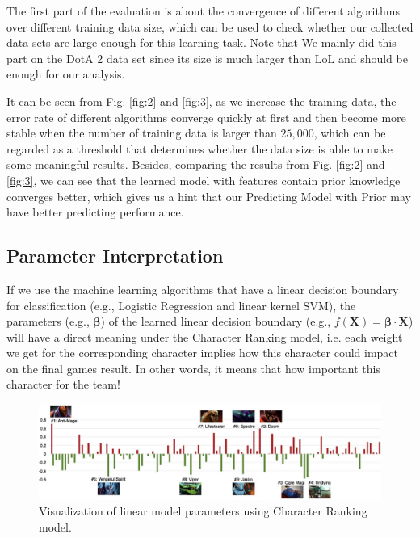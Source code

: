 \documentclass{article} %
\begin{document}
The first part of the evaluation is about the convergence of different algorithms over different training data size, which can be used to check whether our collected data sets are large enough for this learning task. Note that We mainly did this part on the DotA 2 data set since its size is much larger than LoL and should be enough for our analysis.

It can be seen from Fig. \ref{fig:2} and \ref{fig:3}, as we increase the training data, the error rate of different algorithms converge quickly at first and then become more stable when the number of training data is larger than $25,000$, which can be regarded as a threshold that determines whether the data size is able to make some meaningful results. Besides, comparing the results from Fig. \ref{fig:2} and \ref{fig:3}, we can see that the learned model with features contain prior knowledge converges better, which gives us a hint that our Predicting Model with Prior may have better predicting performance.




\subsection{Parameter Interpretation}



If we use the machine learning algorithms that have a linear decision boundary for classification (e.g., Logistic Regression and linear kernel SVM), the parameters (e.g., $\mathbf{\beta}$) of the learned linear decision boundary (e.g., $f(\mathbf{X}) = \mathbf{\beta}\cdot \mathbf{X}$) will have a direct meaning under the Character Ranking model, i.e. each weight we get for the corresponding character implies how this character could impact on the final games result. In other words, it means that how important this character for the team!

\begin{figure}[h]
  \centering
    \includegraphics[width=125mm]{params.pdf}
  \caption{Visualization of linear model parameters using Character Ranking model.}
  \label{fig:params}
\end{figure}
\end{document}
